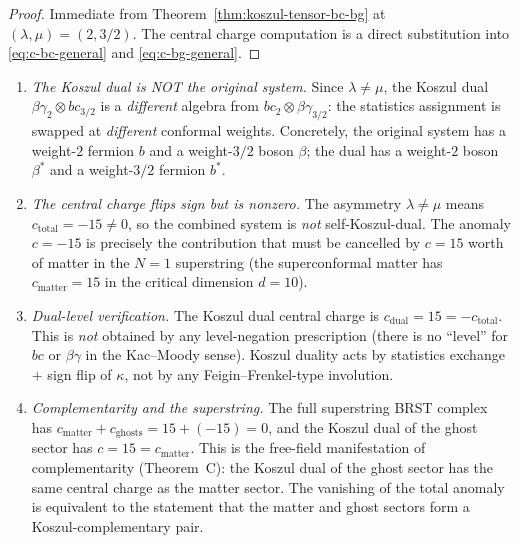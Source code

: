 \documentclass[11pt]{article}
\begin{document}
\begin{proof}
Immediate from Theorem~\ref{thm:koszul-tensor-bc-bg} at
$(\lambda, \mu) = (2, 3/2)$.  The central charge computation is
a direct substitution into \eqref{eq:c-bc-general} and
\eqref{eq:c-bg-general}.
\end{proof}

\begin{remark}
\label{rem:string-koszul-physics}
\mbox{}
\begin{enumerate}
\item \emph{The Koszul dual is NOT the original system.}
  Since $\lambda \neq \mu$, the Koszul dual
  $\beta\gamma_2 \otimes bc_{3/2}$ is a \emph{different}
  algebra from $bc_2 \otimes \beta\gamma_{3/2}$: the
  statistics assignment is swapped at \emph{different}
  conformal weights.  Concretely, the original system has a
  weight-$2$ fermion $b$ and a weight-$3/2$ boson $\beta$;
  the dual has a weight-$2$ boson $\beta^*$ and a weight-$3/2$
  fermion $b^*$.

\item \emph{The central charge flips sign but is nonzero.}
  The asymmetry $\lambda \neq \mu$ means
  $c_{\mathrm{total}} = -15 \neq 0$, so the combined system
  is \emph{not} self-Koszul-dual.  The anomaly $c = -15$
  is precisely the contribution that must be cancelled by
  $c = 15$ worth of matter in the $N = 1$ superstring
  (the superconformal matter has $c_{\mathrm{matter}} = 15$
  in the critical dimension $d = 10$).

\item \emph{Dual-level verification.}  The Koszul dual central
  charge is $c_{\mathrm{dual}} = 15 = -c_{\mathrm{total}}$.
  This is \emph{not} obtained by any level-negation
  prescription (there is no ``level'' for $bc$ or
  $\beta\gamma$ in the Kac--Moody sense).  Koszul duality
  acts by statistics exchange $+$ sign flip of $\kappa$, not
  by any Feigin--Frenkel-type involution.

\item \emph{Complementarity and the superstring.}
  The full superstring BRST complex has
  $c_{\mathrm{matter}} + c_{\mathrm{ghosts}} =
  15 + (-15) = 0$, and the Koszul dual of the ghost sector
  has $c = 15 = c_{\mathrm{matter}}$.  This is the free-field
  manifestation of complementarity (Theorem~C): the Koszul
  dual of the ghost sector has the same central charge as
  the matter sector.  The vanishing of the total anomaly is
  equivalent to the statement that the matter and ghost
  sectors form a Koszul-complementary pair.
\end{enumerate}
\end{remark}
\end{document}
